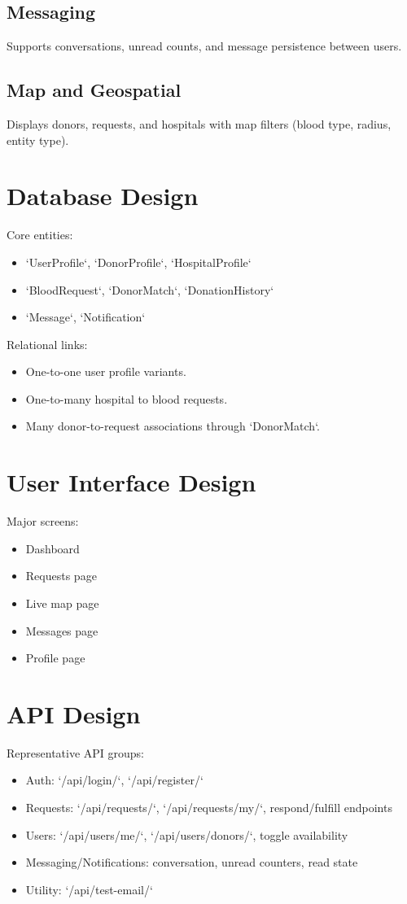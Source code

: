 \documentclass[12pt,a4paper]{report}
\begin{document}
\subsection{Messaging}
Supports conversations, unread counts, and message persistence between users.

\subsection{Map and Geospatial}
Displays donors, requests, and hospitals with map filters (blood type, radius, entity type).

\section{Database Design}
Core entities:
\begin{itemize}[leftmargin=1.5em]
\item `UserProfile`, `DonorProfile`, `HospitalProfile`
\item `BloodRequest`, `DonorMatch`, `DonationHistory`
\item `Message`, `Notification`
\end{itemize}

Relational links:
\begin{itemize}[leftmargin=1.5em]
\item One-to-one user profile variants.
\item One-to-many hospital to blood requests.
\item Many donor-to-request associations through `DonorMatch`.
\end{itemize}

\section{User Interface Design}
Major screens:
\begin{itemize}[leftmargin=1.5em]
\item Dashboard
\item Requests page
\item Live map page
\item Messages page
\item Profile page
\end{itemize}

\section{API Design}
Representative API groups:
\begin{itemize}[leftmargin=1.5em]
\item Auth: `/api/login/`, `/api/register/`
\item Requests: `/api/requests/`, `/api/requests/my/`, respond/fulfill endpoints
\item Users: `/api/users/me/`, `/api/users/donors/`, toggle availability
\item Messaging/Notifications: conversation, unread counters, read state
\item Utility: `/api/test-email/`
\end{itemize}
\end{document}
